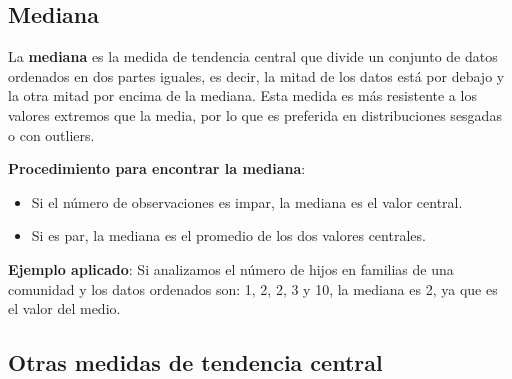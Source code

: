 \documentclass[
  letterpaper,
  DIV=11,
  numbers=noendperiod]{scrreprt}
\providecommand{\tightlist}{%
  \setlength{\itemsep}{0pt}\setlength{\parskip}{0pt}}\usepackage{longtable,booktabs,array}
\begin{document}
\subsection{Mediana}\label{mediana}

La \textbf{mediana} es la medida de tendencia central que divide un
conjunto de datos ordenados en dos partes iguales, es decir, la mitad de
los datos está por debajo y la otra mitad por encima de la mediana. Esta
medida es más resistente a los valores extremos que la media, por lo que
es preferida en distribuciones sesgadas o con outliers.

\begin{tcolorbox}[enhanced jigsaw, toprule=.15mm, opacitybacktitle=0.6, toptitle=1mm, arc=.35mm, left=2mm, title=\textcolor{quarto-callout-tip-color}{\faLightbulb}\hspace{0.5em}{Tip}, titlerule=0mm, leftrule=.75mm, rightrule=.15mm, coltitle=black, bottomtitle=1mm, bottomrule=.15mm, colframe=quarto-callout-tip-color-frame, opacityback=0, colback=white, breakable, colbacktitle=quarto-callout-tip-color!10!white]

\textbf{Procedimiento para encontrar la mediana}:

\begin{itemize}
\tightlist
\item
  Si el número de observaciones es impar, la mediana es el valor
  central.
\item
  Si es par, la mediana es el promedio de los dos valores centrales.
\end{itemize}

\end{tcolorbox}

\begin{tcolorbox}[enhanced jigsaw, toprule=.15mm, opacitybacktitle=0.6, toptitle=1mm, arc=.35mm, left=2mm, title=\textcolor{quarto-callout-tip-color}{\faLightbulb}\hspace{0.5em}{Tip}, titlerule=0mm, leftrule=.75mm, rightrule=.15mm, coltitle=black, bottomtitle=1mm, bottomrule=.15mm, colframe=quarto-callout-tip-color-frame, opacityback=0, colback=white, breakable, colbacktitle=quarto-callout-tip-color!10!white]

\textbf{Ejemplo aplicado}: Si analizamos el número de hijos en familias
de una comunidad y los datos ordenados son: 1, 2, 2, 3 y 10, la mediana
es 2, ya que es el valor del medio.

\end{tcolorbox}

\subsection{Otras medidas de tendencia
central}\label{otras-medidas-de-tendencia-central}
\end{document}
